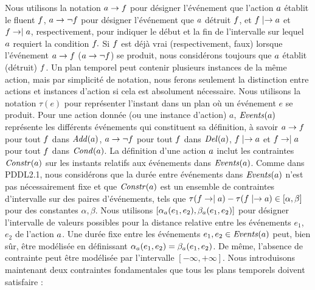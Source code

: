 Nous utilisons la notation $a \rightarrow f$ pour d\'{e}signer l'\'{e}v\'{e}nement que l'action $a$ \'{e}tablit le fluent $f$, $a \rightarrow \neg f$ pour d\'{e}signer l'\'{e}v\'{e}nement que $a$ d\'{e}truit $f$, et $f \mid\rightarrow a$ et $f \rightarrow\mid a$, respectivement, pour indiquer le d\'{e}but et la fin de l'intervalle sur lequel $a$ requiert la condition $f.$ Si $f$ est d\'{e}j\`{a} vrai (respectivement, faux) lorsque l'\'{e}v\'{e}nement
$a \rightarrow f$ ($a \rightarrow \neg f$) se produit, nous consid\'{e}rons toujours que $a$ \'{e}tablit (d\'{e}truit) $f$. Un plan temporel peut contenir plusieurs instances de la m\^{e}me action, mais %
par simplicit\'{e} de notation, nous ferons seulement la distinction entre actions et instances d'action si cela est absolument n\'{e}cessaire. Nous utilisons la notation $\tau(e)$ pour repr\'{e}senter l'instant dans un plan o\`{u} un \'{e}v\'{e}nement $e$ se produit.
Pour une action donn\'{e}e (ou une instance d'action) $a$, $\mathit{Events}(a)$ repr\'{e}sente les diff\'{e}rents \'{e}v\'{e}nements qui constituent sa d\'{e}finition, \`{a} savoir $a \rightarrow f$ pour tout $f$ dans $\mathit{Add}(a)$, $a \rightarrow \neg f$ pour tout $f$ dans $\mathit{Del}(a)$, $f \mid\rightarrow a$ et $f \rightarrow\mid a$ pour tout $f$ dans $\mathit{Cond}(a)$. La d\'{e}finition d'une action $a$ inclut les contraintes $\mathit{Constr}(a)$ sur les instants relatifs aux \'{e}v\'{e}nements dans $\mathit{Events}(a)$. %
Comme dans PDDL2.1, nous consid\'{e}rons que la dur\'{e}e entre \'{e}v\'{e}nements dans $\mathit{Events}(a)$ n'est pas n\'{e}cessairement fixe et que $\mathit{Constr}(a)$ est un ensemble de contraintes d'intervalle sur des paires d'\'{e}v\'{e}nements, tels que
$\tau(f \rightarrow\mid a) - \tau(f \mid\rightarrow a) \in [\alpha,\beta]$ pour des constantes $\alpha,\beta$. Nous utilisons $[\alpha_{a}(e_1, e_2), \beta_{a}(e_1, e_2)]$ pour d\'{e}signer l'intervalle de valeurs possibles pour la distance relative entre les \'{e}v\'{e}nements $e_1$, $e_2$ de l'action $a$. Une dur\'{e}e fixe entre les \'{e}v\'{e}nements $e_1,e_2 \in \mathit{Events}(a)$ peut, bien s\^{u}r, \^{e}tre mod\'{e}lis\'{e}e en d\'{e}finissant $\alpha_{a}(e_1, e_2)=\beta_{a}(e_1, e_2)$. De m\^{e}me, l'absence de contrainte peut \^{e}tre mod\'{e}lis\'{e}e par l'intervalle $[-\infty,+\infty]$. Nous introduisons maintenant deux contraintes fondamentales que tous les plans temporels doivent satisfaire :
